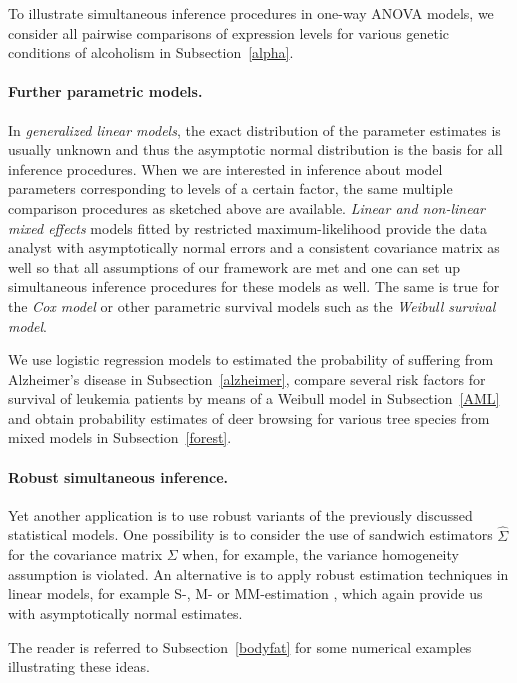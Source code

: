 \documentclass[12pt]{article}
\begin{document}
To illustrate simultaneous inference procedures in one-way ANOVA models, we
consider all pairwise comparisons of expression levels for various genetic
conditions of alcoholism in Subsection~\ref{alpha}.

\paragraph{Further parametric models.}

In \emph{generalized linear models}, the exact distribution of the parameter
estimates is usually unknown and thus the asymptotic normal distribution is
the basis for all inference procedures. When we are interested in inference
about model parameters corresponding to levels of a certain factor, the same
multiple comparison procedures as sketched above are available. \emph{Linear
and non-linear mixed effects} models fitted by restricted maximum-likelihood
provide the data analyst with asymptotically normal errors and a consistent
covariance matrix as well so that all assumptions of our framework are met
and one can set up simultaneous inference procedures for these models as
well. The same is true for the \emph{Cox model} or other parametric survival
models such as the \emph{Weibull survival model}.

We use logistic regression models to estimated the probability of suffering
from Alzheimer's disease in Subsection~\ref{alzheimer}, compare several risk
factors for survival of leukemia patients by means of a Weibull model in
Subsection~\ref{AML} and obtain probability estimates of deer browsing for
various tree species from mixed models in Subsection~\ref{forest}.

\paragraph{Robust simultaneous inference.}

Yet another application is to use robust variants of the previously
discussed statistical models. One possibility is to consider the use of
sandwich estimators $\hat{\Sigma}$ for the covariance matrix $\Sigma$ when,
for example, the variance homogeneity assumption is violated. An alternative
is to apply robust estimation techniques in linear models, for example S-,
M- or MM-estimation 
\citep[see][for
example]{RousseeuwLeroy2003, mfluc:Stefanski+Boos:2002, Yohai1987, mfluc:White:1994}%
, which again provide us with asymptotically normal estimates.

The reader is referred to Subsection~\ref{bodyfat} for some numerical
examples illustrating these ideas.
\end{document}
